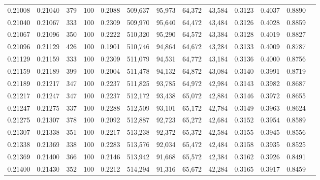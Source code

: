 \begin{tabular}{rrrrrrrrrrrrr}
0.21008 & 0.21040 &   379 & 100 &                                     0.2088 & 509,637 &  95,973 &  64,372 &  43,584 & 0.3123 & 0.4037 & 0.8890 \\
0.21040 & 0.21067 &   333 & 100 &                                     0.2309 & 509,970 &  95,640 &  64,472 &  43,484 & 0.3126 & 0.4028 & 0.8859 \\
0.21067 & 0.21096 &   350 & 100 &                                     0.2222 & 510,320 &  95,290 &  64,572 &  43,384 & 0.3128 & 0.4019 & 0.8827 \\
0.21096 & 0.21129 &   426 & 100 &                                     0.1901 & 510,746 &  94,864 &  64,672 &  43,284 & 0.3133 & 0.4009 & 0.8787 \\
0.21129 & 0.21159 &   333 & 100 &                                     0.2309 & 511,079 &  94,531 &  64,772 &  43,184 & 0.3136 & 0.4000 & 0.8756 \\
0.21159 & 0.21189 &   399 & 100 &                                     0.2004 & 511,478 &  94,132 &  64,872 &  43,084 & 0.3140 & 0.3991 & 0.8719 \\
0.21189 & 0.21217 &   347 & 100 &                                     0.2237 & 511,825 &  93,785 &  64,972 &  42,984 & 0.3143 & 0.3982 & 0.8687 \\
0.21217 & 0.21247 &   347 & 100 &                                     0.2237 & 512,172 &  93,438 &  65,072 &  42,884 & 0.3146 & 0.3972 & 0.8655 \\
0.21247 & 0.21275 &   337 & 100 &                                     0.2288 & 512,509 &  93,101 &  65,172 &  42,784 & 0.3149 & 0.3963 & 0.8624 \\
0.21275 & 0.21307 &   378 & 100 &                                     0.2092 & 512,887 &  92,723 &  65,272 &  42,684 & 0.3152 & 0.3954 & 0.8589 \\
0.21307 & 0.21338 &   351 & 100 &                                     0.2217 & 513,238 &  92,372 &  65,372 &  42,584 & 0.3155 & 0.3945 & 0.8556 \\
0.21338 & 0.21369 &   338 & 100 &                                     0.2283 & 513,576 &  92,034 &  65,472 &  42,484 & 0.3158 & 0.3935 & 0.8525 \\
0.21369 & 0.21400 &   366 & 100 &                                     0.2146 & 513,942 &  91,668 &  65,572 &  42,384 & 0.3162 & 0.3926 & 0.8491 \\
0.21400 & 0.21430 &   352 & 100 &                                     0.2212 & 514,294 &  91,316 &  65,672 &  42,284 & 0.3165 & 0.3917 & 0.8459 \\

\end{tabular}
